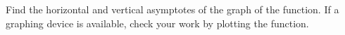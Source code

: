 Find the horizontal and vertical asymptotes of the graph of the function. If a graphing device is available, check your work by plotting the function.
